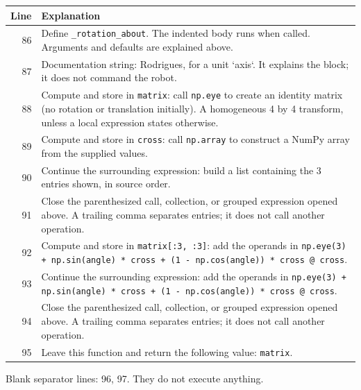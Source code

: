 \documentclass[11pt,a4paper]{book}
\begin{document}
\begin{longtable}{r p{}}

\textbf{Line} & \textbf{Explanation} \\ \hline \endhead

86 & Define \texttt{\_rotation\_about}. The indented body runs when called. Arguments and defaults are explained above. \\

87 & Documentation string: Rodrigues, for a unit `axis`. It explains the block; it does not command the robot. \\

88 & Compute and store in \texttt{matrix}: call \texttt{np.eye} to create an identity matrix (no rotation or translation initially). A homogeneous 4 by 4 transform, unless a local expression states otherwise. \\

89 & Compute and store in \texttt{cross}: call \texttt{np.array} to construct a NumPy array from the supplied values.  \\

90 & Continue the surrounding expression: build a list containing the 3 entries shown, in source order. \\

91 & Close the parenthesized call, collection, or grouped expression opened above. A trailing comma separates entries; it does not call another operation. \\

92 & Compute and store in \texttt{matrix[:3, :3]}: add the operands in \texttt{np.eye(3) + np.sin(angle) * cross + (1 - np.cos(angle)) * cross @ cross}.  \\

93 & Continue the surrounding expression: add the operands in \texttt{np.eye(3) + np.sin(angle) * cross + (1 - np.cos(angle)) * cross @ cross}. \\

94 & Close the parenthesized call, collection, or grouped expression opened above. A trailing comma separates entries; it does not call another operation. \\

95 & Leave this function and return the following value: \texttt{matrix}. \\

\end{longtable}

Blank separator lines: 96, 97. They do not execute anything.
\end{document}

